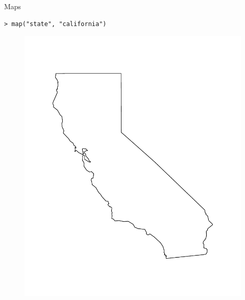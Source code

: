 \documentclass[10pt]{beamer}
\begin{document}
\begin{frame}[fragile]{Maps}
\begin{verbatim}
> map("state", "california")
\end{verbatim}
\begin{figure}[htbp]
\centering
\includegraphics[scale=0.4]{figure/cali.pdf}
\end{figure}
\end{frame}
\end{document}

